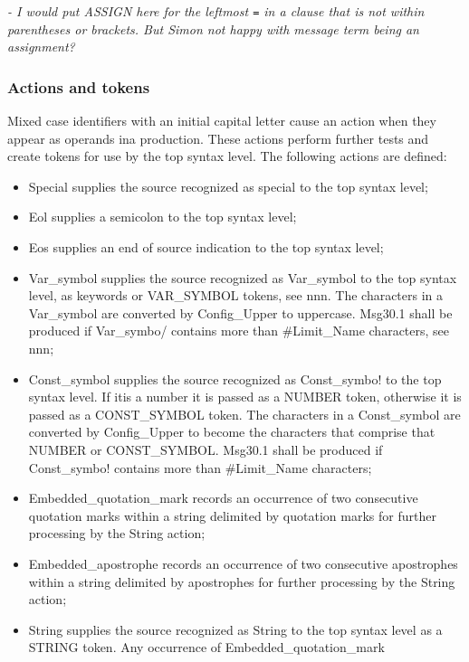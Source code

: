 \emph{- I would put \emph{ASSIGN} here for the leftmost
\texttt{\textquotesingle{}=\textquotesingle{}} in a clause that is not
within parentheses or brackets. But Simon not happy with message term
being an assignment?}

\subsubsection{Actions and tokens}\label{actions-and-tokens}

Mixed case identifiers with an initial capital letter cause an action
when they appear as operands ina production. These actions perform
further tests and create tokens for use by the top syntax level. The
following actions are defined:

\begin{itemize}
\item
  Special supplies the source recognized as special to the top syntax
  level;
\item
  Eol supplies a semicolon to the top syntax level;
\item
  Eos supplies an end of source indication to the top syntax level;
\item
  Var\_symbol supplies the source recognized as Var\_symbol to the top
  syntax level, as keywords or VAR\_SYMBOL tokens, see nnn. The
  characters in a Var\_symbol are converted by Config\_Upper to
  uppercase. Msg30.1 shall be produced if Var\_symbo/ contains more than
  \#Limit\_Name characters, see nnn;
\item
  Const\_symbol supplies the source recognized as Const\_symbo! to the
  top syntax level. If itis a number it is passed as a NUMBER token,
  otherwise it is passed as a CONST\_SYMBOL token. The characters in a
  Const\_symbol are converted by Config\_Upper to become the characters
  that comprise that NUMBER or CONST\_SYMBOL. Msg30.1 shall be produced
  if Const\_symbo! contains more than \#Limit\_Name characters;
\item
  Embedded\_quotation\_mark records an occurrence of two consecutive
  quotation marks within a string delimited by quotation marks for
  further processing by the String action;
\item
  Embedded\_apostrophe records an occurrence of two consecutive
  apostrophes within a string delimited by apostrophes for further
  processing by the String action;
\item
  String supplies the source recognized as String to the top syntax
  level as a STRING token. Any occurrence of Embedded\_quotation\_mark

\end{itemize}
